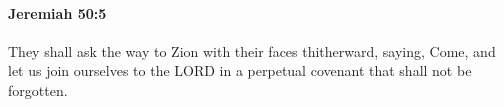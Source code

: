
		\paragraph{Jeremiah 50:5} %
			\label{JEREMIAH-50-5}

			They shall ask the way to Zion with their faces thitherward, saying, Come, and let us join ourselves to the LORD in a perpetual covenant that shall not be forgotten.


